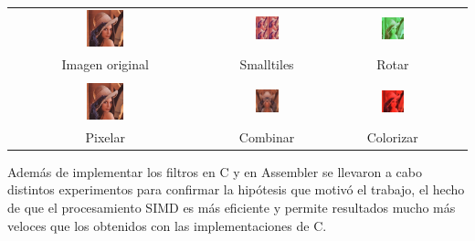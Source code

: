 \begin{center}
 \begin{tabular}{cccc}
   \includegraphics[width=0.2\textwidth]{imagenes/lena.png} &
   \includegraphics[width=0.2\textwidth]{imagenes/lena-smalltiles.png} &
   \includegraphics[width=0.2\textwidth]{imagenes/lena-rotar-canales.png} \\
   Imagen original & Smalltiles & Rotar \\
   \\
   \includegraphics[width=0.2\textwidth]{imagenes/lena-pixelar.png} &
   \includegraphics[width=0.2\textwidth]{imagenes/lena-combinar.png} &
   \includegraphics[width=0.2\textwidth]{imagenes/lena-colorizar.png} \\
   Pixelar & Combinar & Colorizar \\
 \end{tabular}
\end{center}

\par{Además de implementar los filtros en C y en Assembler se llevaron a cabo distintos experimentos para confirmar la hipótesis que motivó el trabajo, el hecho de que el procesamiento SIMD es más eficiente y permite resultados mucho más veloces que los obtenidos con las implementaciones de C.}